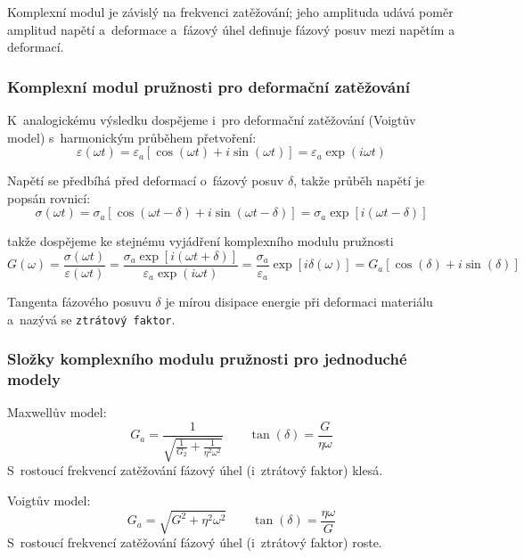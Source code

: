 Komplexní modul je závislý na frekvenci zatěžování; jeho amplituda udává poměr amplitud napětí a~deformace a~fázový úhel definuje fázový posuv mezi napětím a deformací.

\subsubsection{Komplexní modul pružnosti pro deformační zatěžování}
K~analogickému výsledku dospějeme i~pro deformační zatěžování (Voigtův model) s~harmonickým průběhem přetvoření:
\begin{equation}
	\varepsilon(\omega t) = \varepsilon_a \left[\cos(\omega t) + i \sin(\omega t)\right] = \varepsilon_a \exp(i \omega t)
\end{equation}

Napětí se předbíhá před deformací o~fázový posuv $\delta$, takže průběh napětí je popsán rovnicí:
\begin{equation}
	\sigma(\omega t) = \sigma_a \left[\cos(\omega t - \delta) + i \sin(\omega t - \delta)\right] = \sigma_a \exp[i (\omega t - \delta)]
\end{equation}

takže dospějeme ke stejnému vyjádření komplexního modulu pružnosti
\begin{equation}
	G(\omega)
	= \frac{\sigma(\omega t)}{\varepsilon(\omega t)}
	= \frac{\sigma_a \exp\left[ i (\omega t + \delta) \right]}{\varepsilon_a \exp\left( i \omega t \right)}
	= \frac{\sigma_a}{\varepsilon_a} \exp\left[i \delta(\omega) \right]
	= G_a \left[ \cos(\delta) + i \sin(\delta) \right]
\end{equation}

Tangenta fázového posuvu $\delta$ je mírou disipace energie při deformaci materiálu a~nazývá se \texttt{ztrátový faktor}.

\subsubsection{Složky komplexního modulu pružnosti pro jednoduché modely}
Maxwellův model:
\begin{equation}
	G_a = \frac{1}{\sqrt{\frac{1}{G_2} + \frac{1}{\eta^2 \omega^2}}}
	\qquad
	\tan(\delta) = \frac{G}{\eta \omega}
\end{equation}
S~rostoucí frekvencí zatěžování fázový úhel (i~ztrátový faktor) klesá.

Voigtův model:
\begin{equation}
	G_a = \sqrt{G^2 + \eta^2 \omega^2}
	\qquad
	\tan(\delta) = \frac{\eta \omega}{G}
\end{equation}
S~rostoucí frekvencí zatěžování fázový úhel (i~ztrátový faktor) roste.

